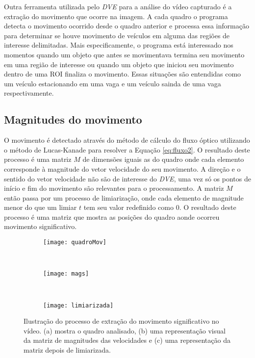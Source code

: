 Outra ferramenta utilizada pelo \textit{DVE} para a análise do vídeo capturado é a extração do movimento que ocorre na imagem. A cada quadro o programa detecta o movimento ocorrido desde o quadro anterior e processa essa informação para determinar se houve movimento de veículos em alguma das regiões de interesse delimitadas. Mais especificamente, o programa está interessado nos momentos quando um objeto que antes se movimentava termina seu movimento em uma região de interesse ou quando um objeto que iniciou seu movimento dentro de uma ROI finaliza o movimento. Essas situações são entendidas como um veículo estacionando em uma vaga e um veículo sainda de uma vaga respectivamente.

\subsection{Magnitudes do movimento}

O movimento é detectado através do método de cálculo do fluxo óptico utilizando o método de Lucas-Kanade\cite{bruhn2005lucas,faria1992fluxo,mota2011tensor} para resolver a Equação \ref{eq:fluxo2}. O resultado deste processo é uma matriz $M$ de dimensões iguais as do quadro onde cada elemento corresponde à magnitude do vetor velocidade do seu movimento. A direção e o sentido do vetor velocidade não são de interesse do \textit{DVE}, uma vez só os pontos de início e fim do movimento são relevantes para o processamento. A matriz $M$ então passa por um processo de limiarização, onde cada elemento de magnitude menor do que um limiar $t$ tem seu valor redefinido como $0$. O resultado deste processo é uma matriz que mostra as posições do quadro aonde ocorreu movimento significativo. 



\begin{figure}
\centering
\begin{subfigure}{.5\textwidth}
  \centering
  \texttt{[image: quadroMov]}
  \caption{}
  \label{fig:ilustraMovimento:sub:quadro}
\end{subfigure}\\
\begin{subfigure}{.5\textwidth}
  \centering
  \texttt{[image: mags]}
  \caption{}
  \label{fig:ilustraMovimento:sub:mags}
\end{subfigure}\\
\begin{subfigure}{.5\textwidth}
  \centering
  \texttt{[image: limiarizada]}
  \caption{}
  \label{fig:ilustraMovimento:sub:limiarizada}
\end{subfigure}
\centering
\caption{Ilustração do processo de extração do movimento significativo no vídeo. (a) mostra o quadro analisado, (b) uma representação visual da matriz de magnitudes das velocidades e (c) uma representação da matriz depois de limiarizada.}
\label{fig:ilustraMovimento}
\end{figure}


